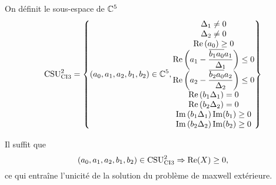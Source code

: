   \begin{defn}
    \label{def:csu:ci3-2}

    On définit le sous-espace de \(\CC^5\)
    \begin{equation*}
      \CSU[2]{CI3} = \left\lbrace 
      (a_0,a_1,a_2,b_1,b_2) \in \CC^5,
      \begin{matrix}
      \Delta_1 \not = 0
      \\
      \Delta_2 \not = 0
      \\
      \Re\left(a_0\right)\ge 0
      \\
      \Re\left(a_1 - \frac{\conj{b_1a_0}a_1}{\Delta_1}\right) \le 0
      \\
      \Re\left(a_2 - \frac{\conj{b_2a_0}a_2}{\Delta_2}\right) \le 0
      \\
      \Re\left(b_1\Delta_1\right) = 0
      \\
      \Re\left(b_2\Delta_2\right) = 0
      \\
      \Im\left(b_1\Delta_1\right)\Im(b_1)\ge 0
      \\
      \Im\left(b_2\Delta_2\right)\Im(b_2)\ge 0
      \end{matrix}
      \right\rbrace
    \end{equation*}
  \end{defn}

  
 \begin{prop}
    \label{prop:csu:ci3-2}
    Il suffit que
    \begin{equation*}
      (a_0,a_1,a_2,b_1,b_2) \in \CSU[2]{CI3} \Rightarrow \Re(X) \ge 0,
    \end{equation*}
    ce qui entraîne l'unicité de la solution du problème de maxwell extérieure.
  \end{prop}

